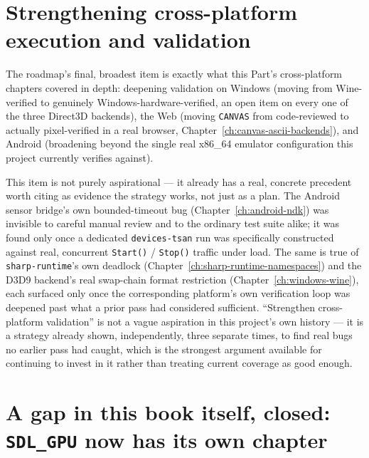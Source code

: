 \section{Strengthening cross-platform execution and validation}

The roadmap's final, broadest item is exactly what this Part's cross-platform chapters
covered in depth: deepening validation on Windows (moving from Wine-verified to genuinely
Windows-hardware-verified, an open item on every one of the three Direct3D backends), the
Web (moving \texttt{CANVAS} from code-reviewed to actually pixel-verified in a real browser,
Chapter~\ref{ch:canvas-ascii-backends}), and Android (broadening beyond the single real
x86\_64 emulator configuration this project currently verifies against).

This item is not purely aspirational --- it already has a real, concrete precedent worth citing
as evidence the strategy works, not just as a plan. The Android sensor bridge's own
bounded-timeout bug (Chapter~\ref{ch:android-ndk}) was invisible to careful manual review and
to the ordinary test suite alike; it was found only once a dedicated \texttt{devices-tsan} run
was specifically constructed against real, concurrent \texttt{Start()} / \texttt{Stop()} traffic
under load. The same is true of \texttt{sharp-runtime}'s own  deadlock
(Chapter~\ref{ch:sharp-runtime-namespaces}) and the D3D9 backend's real swap-chain format restriction
(Chapter~\ref{ch:windows-wine}), each surfaced only once the corresponding platform's own
verification loop was deepened past what a prior pass had considered sufficient. ``Strengthen
cross-platform validation'' is not a vague aspiration in this project's own history --- it is a
strategy already shown, independently, three separate times, to find real bugs no earlier pass
had caught, which is the strongest argument available for continuing to invest in it rather
than treating current coverage as good enough.

\section{A gap in this book itself, closed: \texttt{SDL\_GPU} now has its own chapter}

